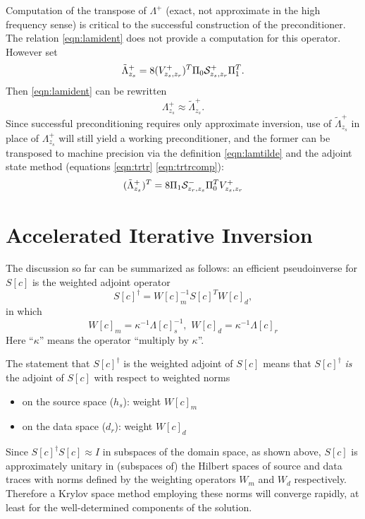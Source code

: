 Computation of the transpose of $\Lambda^+$ (exact, not approximate in
the high frequency sense) is critical to the successful
construction of the preconditioner. The relation \ref{eqn:lamident}
does not provide a computation for this operator. However set
\begin{equation}
  \label{eqn:lamtilde}
  \tilde{\Lambda}^+_{z_s} = 8(V^{+}_{z_s,z_r})^T\Pi_0 {\cal S}^+_{z_s,z_r}\Pi_1^T.
\end{equation}
Then \ref{eqn:lamident} can be rewritten
\[
  \Lambda^+_{z_s} \approx \tilde{\Lambda}^+_{z_s}.
\]
Since successful preconditioning requires only approximate inversion,
use of $\tilde{\Lambda}^+_{z_s} $ in place of $\Lambda^+_{z_s}$ will
still yield a working preconditioner, and the former can be transposed
to machine precision via the definition \ref{eqn:lamtilde} and the adjoint state
method (equations \ref{eqn:trtr} \ref{eqn:trtrcomp}):
\begin{equation}
  \label{eqn:lamtransp}
   (\tilde{\Lambda}^+_{z_s})^T = 8 \Pi_1 {\cal S}^-_{z_r,z_s}\Pi_0^T V^{+}_{z_s,z_r}
\end{equation} 

\section{Accelerated Iterative Inversion}

The discussion so far can be summarized as follows: an efficient pseudoinverse for $S[c]$ is the weighted adjoint operator
\begin{equation}
\label{eqn:wadj}
S[c]^{\dagger} = W[c]_m^{-1}S[c]^TW[c]_d,
\end{equation}
in which 
\begin{equation}
\label{eqn:weights}
W[c]_m = \kappa^{-1}\Lambda[c]^{-1}_s,\,\, W[c]_d = \kappa^{-1}\Lambda[c]_r
\end{equation}
Here ``$\kappa$'' means the operator ``multiply by $\kappa$''.

The statement that $S[c]^{\dagger}$ is the weighted adjoint of $S[c]$ means that $S[c]^{\dagger}$ {\em is} the adjoint of $S[c]$ with respect to weighted norms 
\begin{itemize}
\item on the source space ($h_s$): weight $W[c]_m$
\item on the data space ($d_r$): weight $W[c]_d$
\end{itemize}
Since $S[c]^{\dagger}S[c] \approx I$ in subspaces of the domain space, as shown above, $S[c]$ is approximately unitary in (subspaces of) the Hilbert spaces of source and data traces with norms defined by the weighting operators $W_m$ and $W_d$ respectively. Therefore a Krylov space method employing these norms will converge rapidly, at least for the well-determined components of the solution.

